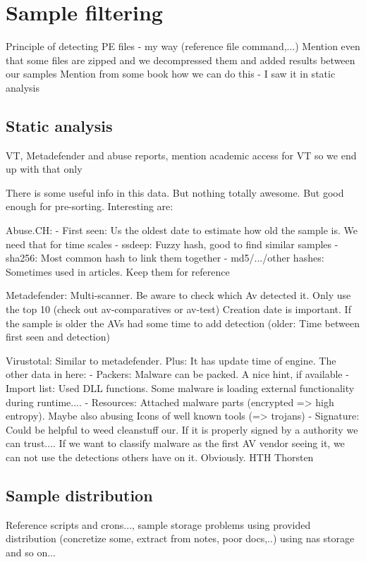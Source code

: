 \section{Sample filtering}
Principle of detecting PE files - my way (reference file command,...)
Mention even that some files are zipped and we decompressed them and added results between our samples
Mention from some book how we can do this - I saw it in static analysis

\subsection{Static analysis}
VT, Metadefender and abuse reports, mention academic access for VT so we end up with that only

There is some useful info in this data. But nothing totally awesome. But good enough for pre-sorting.
Interesting are:

Abuse.CH:
- First seen: Us the oldest date to estimate how old the sample is. We need that for time scales
- ssdeep: Fuzzy hash, good to find similar samples
- sha256: Most common hash to link them together
- md5/.../other hashes: Sometimes used in articles. Keep them for reference

Metadefender:
Multi-scanner. Be aware to check which Av detected it. Only use the top 10 (check out av-comparatives or av-test)
Creation date is important. If the sample is older the AVs had some time to add detection (older: Time between first seen and detection)


Virustotal:
Similar to metadefender. Plus: It has update time of engine.
The other data in here:
- Packers: Malware can be packed. A nice hint, if available
- Import list: Used DLL functions. Some malware is loading external functionality during runtime....
- Resources: Attached malware parts (encrypted => high entropy). Maybe also abusing Icons of well known tools (=> trojans)
- Signature: Could be helpful to weed cleanstuff our. If it is properly signed by a authority we can trust....
If we want to classify malware as the first AV vendor seeing it, we can not use the detections others have on it. Obviously.
HTH
Thorsten


\subsection{Sample distribution}
Reference scripts and crons..., sample storage
problems using provided distribution (concretize some, extract from notes, poor docs,..)
using nas storage and so on...



